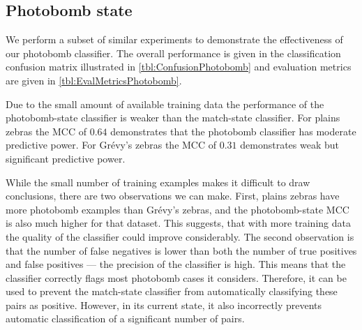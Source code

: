         \PairFailIN{} 

        \PairFailPN{}

        \PairFailNP{}

        \FloatBarrier{}


    \FloatBarrier{}
    \subsection{Photobomb state}
        We perform a subset of similar experiments to demonstrate the effectiveness of our photobomb classifier.
        The overall performance is given in the classification confusion matrix illustrated in
          \cref{tbl:ConfusionPhotobomb} and evaluation metrics are given in \cref{tbl:EvalMetricsPhotobomb}.

        Due to the small amount of available training data the performance of the photobomb-state classifier is
          weaker than the match-state classifier.
        For plains zebras the MCC of $0.64$ demonstrates that the photobomb classifier has moderate predictive
          power.
        For Grévy's zebras the MCC of $0.31$ demonstrates weak but significant predictive power.

        While the small number of training examples makes it difficult to draw conclusions, there are two
          observations we can make.
        First, plains zebras have more photobomb examples than Grévy's zebras, and the photobomb-state MCC is
          also much higher for that dataset.
        This suggests, that with more training data the quality of the classifier could improve considerably.
        The second observation is that the number of false negatives is lower than both the number of true
          positives and false positives --- \ie{} the precision of the classifier is high.
        This means that the classifier correctly flags most photobomb cases it considers.
        Therefore, it can be used to prevent the match-state classifier from automatically classifying these
          pairs as positive.
        However, in its current state, it also incorrectly prevents automatic classification of a significant
          number of pairs.



